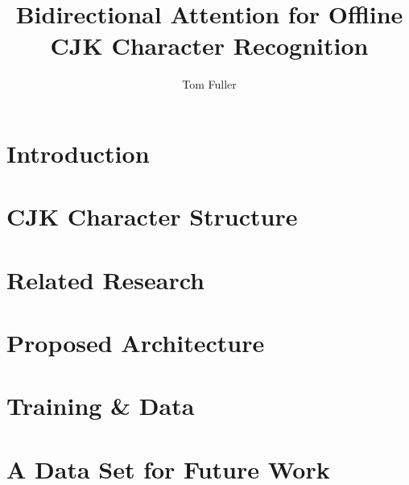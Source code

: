 \documentclass[10pt,letterpaper]{article}
\title{Bidirectional Attention for Offline CJK Character Recognition}
\author{Tom Fuller}
\begin{document}
\maketitle
\listoffigures

\section{Introduction}


\section{CJK Character Structure}


\section{Related Research}


\section{Proposed Architecture}


\section{Training \& Data}


\section{A Data Set for Future Work}




\end{document}
